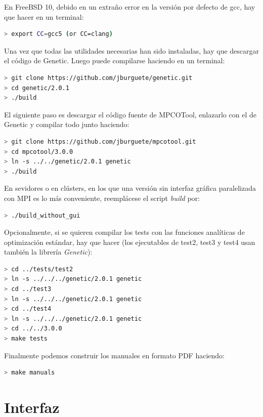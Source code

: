 \documentclass[a4paper]{report}
\begin{document}
En FreeBSD 10, debido en un extraño error en la versión por defecto de gcc, hay
que hacer en un terminal:
\begin{lstlisting}[language=bash,basicstyle=\scriptsize]
> export CC=gcc5 (or CC=clang)
\end{lstlisting}

Una vez que todas las utilidades necesarias han sido instaladas, hay que
descargar el código de Genetic. Luego puede compilarse haciendo en un terminal:
\begin{lstlisting}[language=bash,basicstyle=\scriptsize]
> git clone https://github.com/jburguete/genetic.git
> cd genetic/2.0.1
> ./build
\end{lstlisting}

El siguiente paso es descargar el código fuente de MPCOTool, enlazarlo con el
de Genetic y compilar todo junto haciendo:
\begin{lstlisting}[language=bash,basicstyle=\scriptsize]
> git clone https://github.com/jburguete/mpcotool.git
> cd mpcotool/3.0.0
> ln -s ../../genetic/2.0.1 genetic
> ./build
\end{lstlisting}

En sevidores o en clústers, en los que una versión sin interfaz gráfica
paralelizada con MPI es lo más conveniente, reemplácese el script \emph{build}
por:
\begin{lstlisting}[language=bash,basicstyle=\scriptsize]
> ./build_without_gui
\end{lstlisting}
 
Opcionalmente, si se quieren compilar los tests con las funciones analíticas de
optimización estándar, hay que hacer (los ejecutables de test2, test3 y test4
usan también la librería \emph{Genetic}):
\begin{lstlisting}[language=bash,basicstyle=\scriptsize]
> cd ../tests/test2
> ln -s ../../../genetic/2.0.1 genetic
> cd ../test3
> ln -s ../../../genetic/2.0.1 genetic
> cd ../test4
> ln -s ../../../genetic/2.0.1 genetic
> cd ../../3.0.0
> make tests
\end{lstlisting}

Finalmente podemos construir los manuales en formato PDF haciendo:
\begin{lstlisting}[language=bash,basicstyle=\scriptsize]
> make manuals
\end{lstlisting}

\chapter{Interfaz}
\end{document}
